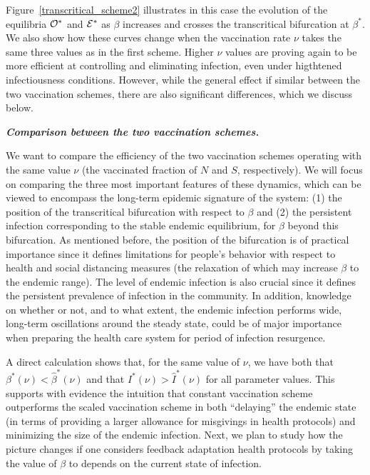 \documentclass[10pt]{article}
\begin{document}
Figure~\ref{transcritical_scheme2} illustrates in this case the evolution of the equilibria ${\cal O}^*$ and ${\cal E}^*$ as $\beta$ increases and crosses the transcritical bifurcation at $\beta ^*$. We also show how these curves change when the vaccination rate $\nu$ takes the same three values as in the first scheme. Higher $\nu$ values are proving again to be more efficient at controlling and eliminating infection, even under higthtened infectiousness conditions. However, while the general effect if similar between the two vaccination schemes, there are also significant differences, which we discuss below.




\vspace{5mm}
\noindent \textbf{\emph{Comparison between the two vaccination schemes.}}

\noindent We want to compare the efficiency of the two vaccination schemes operating with the same value $\nu$ (the vaccinated fraction of $N$ and $S$, respectively). We will focus on comparing the three most important features of these dynamics, which can be viewed to encompass the long-term epidemic signature of the system: (1) the position of the transcritical bifurcation with respect to $\beta$ and (2) the persistent infection corresponding to the stable endemic equilibrium, for $\beta$ beyond this bifurcation.
As mentioned before, the position of the bifurcation is of practical importance since it defines limitations for people's behavior with respect to health and social distancing measures (the relaxation of which may increase $\beta$ to the endemic range). The level of endemic infection is also crucial since it defines the persistent prevalence of infection in the community. In addition, knowledge on whether or not, and to what extent, the endemic infection performs wide, long-term oscillations around the steady state, could be of major importance when preparing the health care system for period of infection resurgence.

A direct calculation shows that, for the same value of $\nu$, we have both that $\beta^*(\nu)<\hat{\beta}^*(\nu)$ and that $I^*(\nu) > \hat{I}^*(\nu)$ for all parameter values. This supports with evidence the intuition that constant vaccination scheme outperforms the scaled vaccination scheme in both ``delaying'' the  endemic state (in terms of providing a larger allowance for misgivings in health protocols) and minimizing the size of the endemic infection. Next, we plan to study how the picture changes if one considers feedback adaptation health protocols by taking the value of $\beta$ to depends on the current state of infection. 
\end{document}
